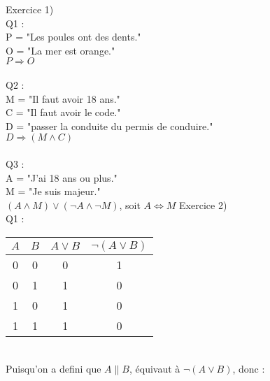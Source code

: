 \documentclass{article}
\begin{document}
\noindent Exercice 1)
\newline
\\
Q1 :
\newline
\\
P = "Les poules ont des dents."
\newline
\\
O = "La mer est orange."
\newline
\\
$P \Rightarrow O$
\newline
\\
\\
Q2 :
\newline
\\
M = "Il faut avoir 18 ans."
\newline
\\
C = "Il faut avoir le code."
\newline
\\
D = "passer la conduite du permis de conduire."
\newline
\\
$D \Rightarrow (M \land C)$
\newline
\\
\\
Q3 :
\newline
\\
A = "J'ai 18 ans ou plus."
\newline
\\
M = "Je suis majeur."
\newline
\\
$(A \land M) \lor (\neg A \land \neg M)$, soit $A \Leftrightarrow M$
\newpage
\noindent Exercice 2)
\newline
\\
Q1 :
\newline
\\
\begin{tabular}{|c|c|c|c|}
\hline
$A$ & $B$ & $A \lor B$ & $\neg (A \lor B)$ \\ 
\hline
0 & 0 & 0 & 1 \\ 
\hline
0 & 1 & 1 & 0 \\ 
\hline
1 & 0 & 1 & 0 \\ 
\hline
1 & 1 & 1 & 0 \\ 
\hline
\end{tabular}
\vspace*{3mm}
\newline
\\
Puisqu'on a defini que $A \parallel B$, équivaut à $\neg (A \lor B)$, donc : 
\newline
\end{document}
